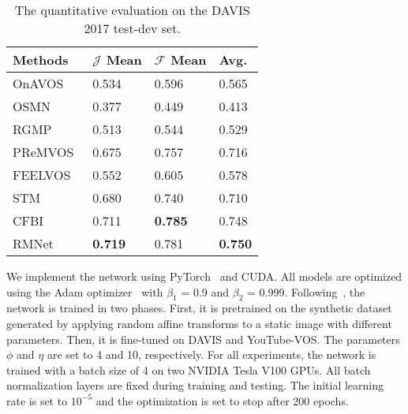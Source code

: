 \documentclass[final]{cvpr}
\begin{document}
\begin{table}
  \caption{The quantitative evaluation on the DAVIS 2017 test-dev set.}
  \vspace{.5 mm}
  \begin{tabularx}{\linewidth}{lYYY}
    \toprule
    Methods       & $\mathcal{J}$ Mean & $\mathcal{F}$ Mean
                  & Avg. \\
    \midrule
    OnAVOS~\cite{DBLP:conf/bmvc/VoigtlaenderL17}
                  & 0.534      & 0.596      & 0.565 \\
    OSMN~\cite{DBLP:conf/cvpr/YangWXYK18}
                  & 0.377      & 0.449      & 0.413 \\
    RGMP~\cite{DBLP:conf/cvpr/OhLSK18}
                  & 0.513      & 0.544      & 0.529 \\
    PReMVOS~\cite{DBLP:conf/accv/LuitenVL18}
                  & 0.675      & 0.757      & 0.716 \\
    FEELVOS~\cite{DBLP:conf/cvpr/VoigtlaenderCSA19}
                  & 0.552      & 0.605      & 0.578 \\
    STM~\cite{DBLP:conf/iccv/OhLXK19}
                  & 0.680      & 0.740      & 0.710 \\
    CFBI~\cite{DBLP:conf/eccv/YangWY20}
                  & 0.711      & \bf{0.785} & 0.748 \\
    \midrule
    RMNet         & \bf{0.719} & 0.781      & \bf{0.750} \\
    \bottomrule
  \end{tabularx}
  \label{tab:davis2017-test-dev}
  \vspace{-2 mm}
\end{table}

We implement the network using PyTorch~\cite{DBLP:conf/nips/AdamSSGEZZALA19} and CUDA.
All models are optimized using the Adam optimizer~\cite{DBLP:conf/iclr/KingmaB15} with $\beta_1$ = 0.9 and $\beta_2$ = 0.999.
Following~\cite{DBLP:conf/iccv/OhLXK19,DBLP:conf/eccv/SeongHK20}, the network is trained in two phases.
First, it is pretrained on the synthetic dataset generated by applying random affine transforms to a static image with different parameters.
Then, it is fine-tuned on DAVIS and YouTube-VOS. 
The parameters $\phi$ and $\eta$ are set to 4 and 10, respectively. 
For all experiments, the network is trained with a batch size of 4 on two NVIDIA Tesla V100 GPUs.
All batch normalization layers are fixed during training and testing.
The initial learning rate is set to $10^{-5}$ and the optimization is set to stop after 200 epochs.
\end{document}
